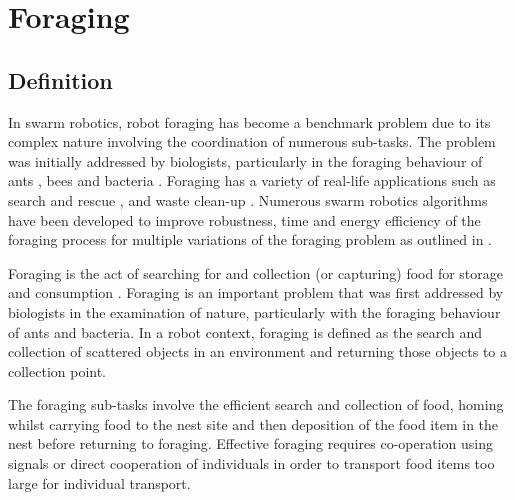 
\chapter{Foraging}
\label{chap:second}




\section{Definition}
\label{sec:second:definition}

In swarm robotics, robot foraging has become a benchmark problem due to its complex nature involving the coordination of numerous sub-tasks. The problem was initially addressed by biologists, particularly in the foraging behaviour of ants \cite{holldobler1990ants,bernstein1974seasonal}, bees \cite{seeley2009wisdom} and bacteria \cite{resnick1994turtles}. Foraging has a variety of real-life applications such as search and rescue \cite{jennings1997cooperative,murphy2000biomimetic}, and waste clean-up \cite{balch1995io}. Numerous swarm robotics algorithms have been developed to improve robustness, time and energy efficiency of the foraging process for multiple variations of the foraging problem as outlined in \cite{winfield2009foraging}. 

Foraging is the act of searching for and collection (or capturing) food for storage and consumption \cite{winfield2009foraging}. Foraging is an important problem that was first addressed by biologists in the examination of nature, particularly with the foraging behaviour of ants and bacteria. In a robot context, foraging is defined as the search and collection of scattered objects in an environment and returning those objects to a collection point.

The foraging sub-tasks involve the efficient search and collection of food, homing whilst carrying food to the nest site and then deposition of the food item in the nest before returning to foraging. Effective foraging requires co-operation using signals or direct cooperation of individuals in order to transport food items too large for individual transport.  

